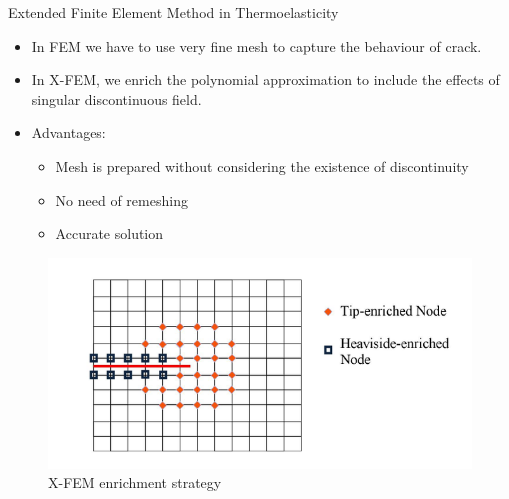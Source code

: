 \documentclass{beamer}
\begin{document}
\begin{frame}[t,fragile]{Extended Finite Element Method in Thermoelasticity}
    \vspace{-.5cm}
    \small
    \begin{itemize}
        \item In FEM we have to use very fine mesh to capture the behaviour of crack.
\item In X-FEM, we enrich the polynomial approximation to include the effects of singular discontinuous field.
    \item Advantages:
    \begin{itemize}
        \item Mesh is prepared without considering the existence of discontinuity
        \item No need of remeshing
        \item Accurate solution
    \end{itemize}
\end{itemize}
\begin{figure}
     \centering
     \vspace{-10pt}
     \includegraphics[scale=.3]{enrich.png}
     \vspace{-.4cm}
     \caption{\hspace{-2cm}\footnotesize X-FEM enrichment strategy}
  \end{figure}
\end{frame}
\end{document}

